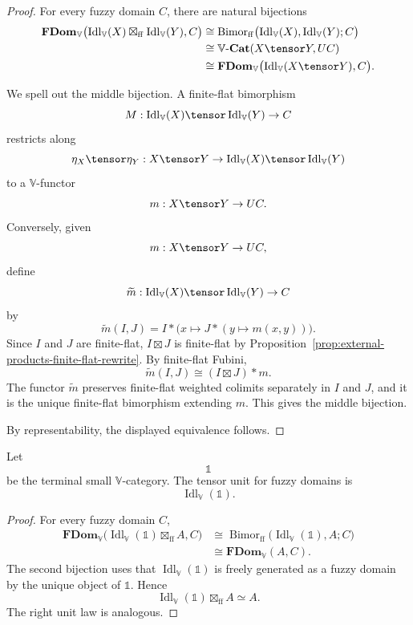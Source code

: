 \begin{proof}
For every fuzzy domain \(C\), there are natural bijections
\[
\begin{aligned}
\mathbf{FDom}_{\mathbb V}
\bigl(
    \operatorname{Idl}_{\mathbb V}(X)
    \boxtimes_{\mathrm{ff}}
    \operatorname{Idl}_{\mathbb V}(Y),
    C
\bigr)
&\cong
\operatorname{Bimor}_{\mathrm{ff}}
\bigl(
    \operatorname{Idl}_{\mathbb V}(X),
    \operatorname{Idl}_{\mathbb V}(Y);
    C
\bigr)
\\
&\cong
\mathbb V\text{-}\mathbf{Cat}(X\tensor Y,UC)
\\
&\cong
\mathbf{FDom}_{\mathbb V}
\bigl(
    \operatorname{Idl}_{\mathbb V}(X\tensor Y),
    C
\bigr).
\end{aligned}
\]

We spell out the middle bijection.  A finite-flat bimorphism
\[
    M:\operatorname{Idl}_{\mathbb V}(X)\tensor
      \operatorname{Idl}_{\mathbb V}(Y)\to C
\]
restricts along
\[
    \eta_X\tensor\eta_Y:X\tensor Y\to
    \operatorname{Idl}_{\mathbb V}(X)\tensor
    \operatorname{Idl}_{\mathbb V}(Y)
\]
to a \(\mathbb V\)-functor
\[
    m:X\tensor Y\to UC.
\]
Conversely, given
\[
    m:X\tensor Y\to UC,
\]
define
\[
    \widetilde m:
    \operatorname{Idl}_{\mathbb V}(X)\tensor
    \operatorname{Idl}_{\mathbb V}(Y)
    \to C
\]
by
\[
    \widetilde m(I,J)
    =
    I*\bigl(x\mapsto J*(y\mapsto m(x,y))\bigr).
\]
Since \(I\) and \(J\) are finite-flat, \(I\boxtimes J\) is finite-flat by
Proposition~\ref{prop:external-products-finite-flat-rewrite}.  By finite-flat
Fubini,
\[
    \widetilde m(I,J)
    \cong
    (I\boxtimes J)*m.
\]
The functor \(\widetilde m\) preserves finite-flat weighted colimits separately
in \(I\) and \(J\), and it is the unique finite-flat bimorphism extending
\(m\).  This gives the middle bijection.

By representability, the displayed equivalence follows.
\end{proof}

\begin{corollary}
\label{cor:tensor-unit-fdom-rewrite}
Let
\[
    \mathbb 1
\]
be the terminal small \(\mathbb V\)-category.  The tensor unit for fuzzy domains
is
\[
    \operatorname{Idl}_{\mathbb V}(\mathbb 1).
\]
\end{corollary}

\begin{proof}
For every fuzzy domain \(C\),
\[
\begin{aligned}
    \mathbf{FDom}_{\mathbb V}
    \bigl(
        \operatorname{Idl}_{\mathbb V}(\mathbb 1)
        \boxtimes_{\mathrm{ff}}A,
        C
    \bigr)
    &\cong
    \operatorname{Bimor}_{\mathrm{ff}}
    \bigl(
        \operatorname{Idl}_{\mathbb V}(\mathbb 1),
        A;
        C
    \bigr)
    \\
    &\cong
    \mathbf{FDom}_{\mathbb V}(A,C).
\end{aligned}
\]
The second bijection uses that
\(\operatorname{Idl}_{\mathbb V}(\mathbb 1)\) is freely generated as a fuzzy
domain by the unique object of \(\mathbb 1\).  Hence
\[
    \operatorname{Idl}_{\mathbb V}(\mathbb 1)
    \boxtimes_{\mathrm{ff}}A
    \simeq
    A.
\]
The right unit law is analogous.
\end{proof}


